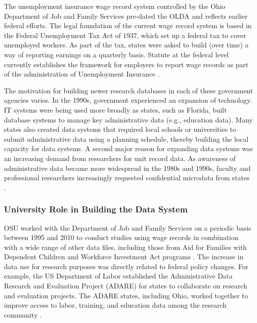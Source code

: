 The unemployment insurance wage record system controlled by the Ohio Department of Job and Family Services pre-dated the OLDA and reflects earlier federal efforts. The legal foundation of the current wage record system is based in the Federal Unemployment Tax Act of 1937, which set up a federal tax to cover unemployed workers. As part of the tax, states were asked to build (over time) a way of reporting earnings on a quarterly basis. Statute at the federal level currently establishes the framework for employers to report wage records as part of the administration of Unemployment Insurance \citep{workforceinformationcouncil2014}.

The motivation for building newer research databases in each of these government agencies varies. In the 1990s, government experienced an expansion of technology. IT systems were being used more broadly as states, such as Florida, built database systems to manage key administrative data (e.g., education data). Many states also created data systems that required local schools or universities to submit administrative data using a planning schedule, thereby building the local capacity for data systems. A second major reason for expanding data systems was an increasing demand from researchers for unit record data. As awareness of administrative data became more widespread in the 1980s and 1990s, faculty and professional researchers increasingly requested confidential microdata from states \citep{borus1982, pfeiffer1998, stevens1989, stevens2012}.

\hypertarget{university-role-in-building-the-data-system}{%
\subsubsection*{University Role in Building the Data System}\label{university-role-in-building-the-data-system}}

OSU worked with the Department of Job and Family Services on a periodic basis between 1995 and 2010 to conduct studies using wage records in combination with a wide range of other data files, including those from Aid for Families with Dependent Children and Workforce Investment Act programs \citep{centerforhumanresourceresearch2001}. The increase in data use for research purposes was directly related to federal policy changes. For example, the US Department of Labor established the Administrative Data Research and Evaluation Project (ADARE) for states to collaborate on research and evaluation projects. The ADARE states, including Ohio, worked together to improve access to labor, training, and education data among the research community \citep{stevens2012}.

